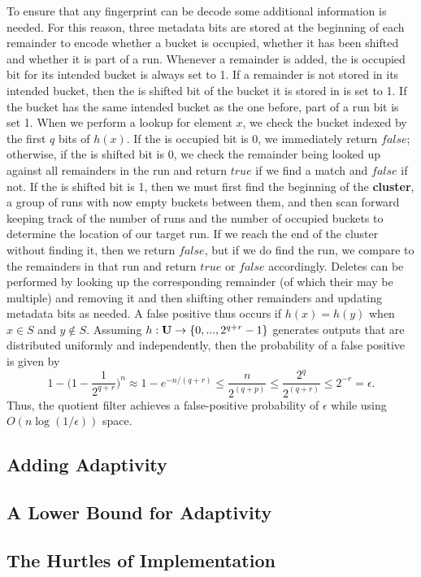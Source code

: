 \documentclass[../paper.tex]{subfiles}
\begin{document}
	To ensure that any fingerprint can be decode some additional information is needed.   For this reason, three metadata bits are stored at the beginning of each remainder to encode whether a bucket is occupied, whether it has been shifted and whether it is part of a run.  Whenever a remainder is added, the is occupied bit for its intended bucket is always set to 1.  If a remainder is not stored in its intended bucket, then the is shifted bit of the bucket it is stored in is set to 1.  If the bucket has the same intended bucket as the one before, part of a run bit is set 1.  When we perform a lookup for element $x$, we check the bucket indexed by the first $q$ bits of $h(x)$.  If the is occupied bit is 0, we immediately return $false$; otherwise, if the is shifted bit is 0, we check the remainder being looked up against all remainders in the run and return $true$ if we find a match and $false$ if not.  If the is shifted bit is 1, then we must first find the beginning of the {\bf cluster}, a group of runs with now empty buckets between them, and then scan forward keeping track of the number of runs and the number of occupied buckets to determine the location of our target run.  If we reach the end of the cluster without finding it, then we return $false$, but if we do find the run, we compare to the remainders in that run and return $true$ or $false$ accordingly.  Deletes can be performed by looking up the corresponding remainder (of which their may be multiple) and removing it and then shifting other remainders and updating metadata bits as needed.  A false positive thus occurs if $h(x) = h(y)$ when $x \in S$ and $y \notin S$.  Assuming $h: {\bf U} \rightarrow \{0, ... , 2^{q+r}-1\}$ generates outputs that are distributed uniformly and independently, then the probability of a false positive is given by 
	$$ 1 - \big(1 - \frac{1}{2^{q+r}}\big)^n \approx 1- e^{-n/(q+r)} \leq \frac{n}{2^{(q+p)}} \leq \frac{2^q}{2^{(q+r)}} \leq 2^{-r} = \epsilon .$$
Thus, the quotient filter achieves a false-positive probability of $\epsilon$ while using $O(n \log (1/\epsilon))$ space.  	

\subsection{Adding Adaptivity}
	

\subsection{A Lower Bound for Adaptivity}


\subsection{The Hurtles of Implementation}
\end{document}
